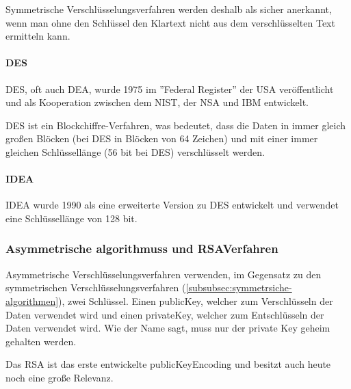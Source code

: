 Symmetrische Verschlüsselungsverfahren werden deshalb als sicher anerkannt, wenn man ohne den Schlüssel den Klartext nicht aus dem verschlüsselten Text ermitteln kann. \autocite[\pagef~5]{kryptographische_algorithmen}

\paragraph{\acf{DES}}\label{paragraph:data-encryption-standard}
\ac{DES}, oft auch \ac{DEA}, wurde 1975 im ''Federal Register'' der USA
veröffentlicht und als Kooperation zwischen dem \ac{NIST}, der \ac{NSA} und IBM entwickelt. \autocite[\pagef~232]{nsa-meyer}

\ac{DES} ist ein Blockchiffre-Verfahren, was bedeutet, dass die Daten in immer gleich großen Blöcken (bei \ac{DES} in Blöcken von 64 Zeichen) und mit einer immer gleichen Schlüssellänge (56 bit bei \ac{DES}) verschlüsselt werden. \autocite[\pagef~6]{kryptographische_algorithmen}

\paragraph{\acf{IDEA}}\label{paragraph:internet-datatencryption-algorithm}
\ac{IDEA} wurde 1990 als eine erweiterte Version zu \ac{DES} entwickelt und verwendet eine Schlüssellänge von 128 bit. \autocite[\pagef~6]{kryptographische_algorithmen}

\subsubsection[Asymmetrische Algorithmen und RSA-Verfahren]{Asymmetrische \glspl{algorithmus} und \acs{RSA}\nobreakdash Verfahren}\label{subsubsec:asymmetrische-algorithmen}
Asymmetrische Verschlüsselungsverfahren verwenden, im Gegensatz zu den symmetrischen Verschlüsselungsverfahren (\autoref{subsubsec:symmetrsiche-algorithmen}), zwei Schlüssel. Einen \gls{publicKey}, welcher zum Verschlüsseln der Daten verwendet wird und einen \gls{privateKey}, welcher zum Entschlüsseln der Daten verwendet wird. Wie der Name sagt, muss nur der private Key geheim gehalten werden.

Das \ac{RSA} ist das erste entwickelte \gls{publicKeyEncoding} und besitzt auch heute noch eine große Relevanz. \autocite[\pagef~168]{buchmann_einfuhrung_2016}

